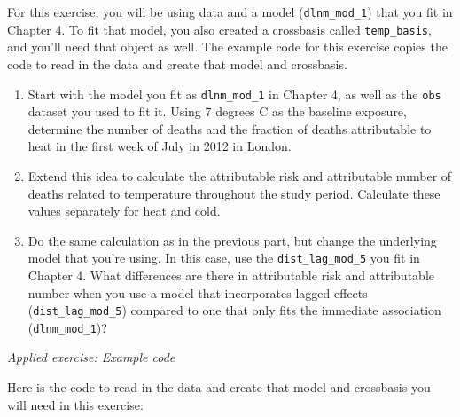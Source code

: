 \documentclass[
]{book}
\providecommand{\tightlist}{%
  \setlength{\itemsep}{0pt}\setlength{\parskip}{0pt}}
\begin{document}
For this exercise, you will be using data and a model (\texttt{dlnm\_mod\_1}) that you fit in Chapter 4. To fit that model, you also created a crossbasis called \texttt{temp\_basis}, and you'll need that object as well. The example code for this exercise copies the code to read in the data and create that model and crossbasis.

\begin{enumerate}
\def\labelenumi{\arabic{enumi}.}
\tightlist
\item
  Start with the model you fit as \texttt{dlnm\_mod\_1} in Chapter 4, as well as the \texttt{obs} dataset you used to fit it. Using 7 degrees C as the baseline exposure, determine the number of deaths and the fraction of deaths attributable to heat in the first week of July in 2012 in London.
\item
  Extend this idea to calculate the attributable risk and attributable number of deaths related to temperature throughout the study period. Calculate these values separately for heat and cold.
\item
  Do the same calculation as in the previous part, but change the underlying model that you're using. In this case, use the \texttt{dist\_lag\_mod\_5} you fit in Chapter 4. What differences are there in attributable risk and attributable number when you use a model that incorporates lagged effects (\texttt{dist\_lag\_mod\_5}) compared to one that only fits the immediate association (\texttt{dlnm\_mod\_1})?
\end{enumerate}

\emph{Applied exercise: Example code}

Here is the code to read in the data and create that model and crossbasis you will need in this exercise:
\end{document}

